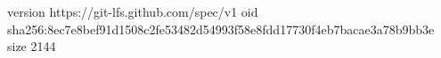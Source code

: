 version https://git-lfs.github.com/spec/v1
oid sha256:8ec7e8bef91d1508c2fe53482d54993f58e8fdd17730f4eb7bacae3a78b9bb3e
size 2144
